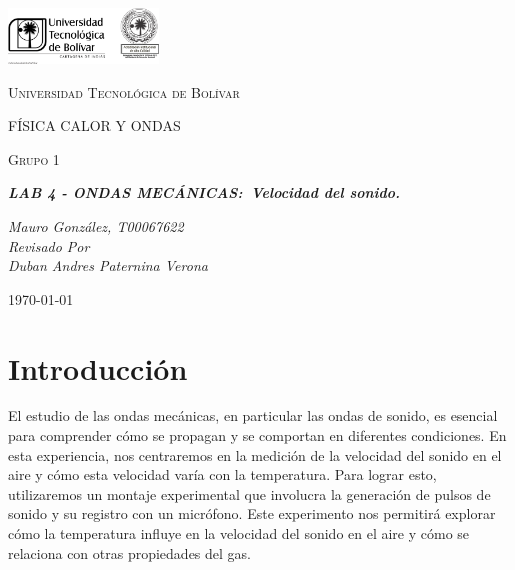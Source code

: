 \documentclass[twocolumn, 12pt]{article}
\begin{document}
\begin{titlepage}
    \centering
    \includegraphics[width=0.3\textwidth]{Images/logo_utb.png}\par\vspace{1cm}
    {\scshape\LARGE Universidad Tecnológica de Bolívar \par}
    \vspace{1cm}

    {\scshape\Large FÍSICA CALOR Y ONDAS \par}
    \vspace{.2cm}

    {\scshape\Large Grupo 1 \par}
    \vspace{1cm}
    \slshape {\Large \bfseries{}LAB 4 - ONDAS MECÁNICAS:~Velocidad del sonido.\\}
    \vspace{4cm}

    \slshape {\itshape{} Mauro González, T00067622 \\}
    \vfill
    Revisado Por \\
    Duban Andres Paternina Verona\\
    {\large \today\par}
\end{titlepage}

\section{Introducción}

El estudio de las ondas mecánicas, en particular las ondas
de sonido, es esencial para comprender cómo se propagan y
se comportan en diferentes condiciones. En esta
experiencia, nos centraremos en la medición de la velocidad
del sonido en el aire y cómo esta velocidad varía con la
temperatura. Para lograr esto, utilizaremos un montaje
experimental que involucra la generación de pulsos de
sonido y su registro con un micrófono. Este experimento nos
permitirá explorar cómo la temperatura influye en la
velocidad del sonido en el aire y cómo se relaciona con
otras propiedades del gas.
\end{document}
